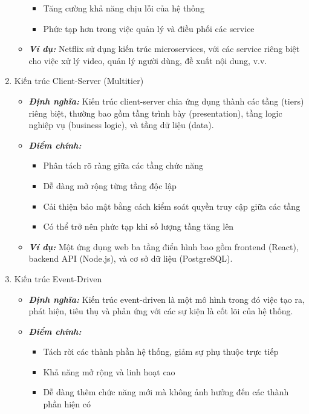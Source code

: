 \begin{enumerate}
\begin{itemize}
\begin{itemize}
            \item Tăng cường khả năng chịu lỗi của hệ thống
            \item Phức tạp hơn trong việc quản lý và điều phối các service
        \end{itemize}
        \item \textbf{\textit{Ví dụ:}} Netflix sử dụng kiến trúc microservices, với các service riêng biệt cho việc xử lý video, quản lý người dùng, đề xuất nội dung, v.v.
    \end{itemize}
    \item Kiến trúc Client-Server (Multitier)
    \begin{itemize}
        \item \textbf{\textit{Định nghĩa:}} Kiến trúc client-server chia ứng dụng thành các tầng (tiers) riêng biệt, thường bao gồm tầng trình bày (presentation), tầng logic nghiệp vụ (business logic), và tầng dữ liệu (data).
        \item \textbf{\textit{Điểm chính:}} 
        \begin{itemize}
            \item Phân tách rõ ràng giữa các tầng chức năng
            \item Dễ dàng mở rộng từng tầng độc lập
            \item Cải thiện bảo mật bằng cách kiểm soát quyền truy cập giữa các tầng
            \item Có thể trở nên phức tạp khi số lượng tầng tăng lên
        \end{itemize}
        \item \textbf{\textit{Ví dụ:}} Một ứng dụng web ba tầng điển hình bao gồm frontend (React), backend API (Node.js), và cơ sở dữ liệu (PostgreSQL).
    \end{itemize}
    \item Kiến trúc Event-Driven
    \begin{itemize}
        \item \textbf{\textit{Định nghĩa:}} Kiến trúc event-driven là một mô hình trong đó việc tạo ra, phát hiện, tiêu thụ và phản ứng với các sự kiện là cốt lõi của hệ thống.
        \item \textbf{\textit{Điểm chính:}} 
        \begin{itemize}
            \item Tách rời các thành phần hệ thống, giảm sự phụ thuộc trực tiếp
            \item Khả năng mở rộng và linh hoạt cao
            \item Dễ dàng thêm chức năng mới mà không ảnh hưởng đến các thành phần hiện có

\end{itemize}
\end{itemize}
\end{enumerate}
